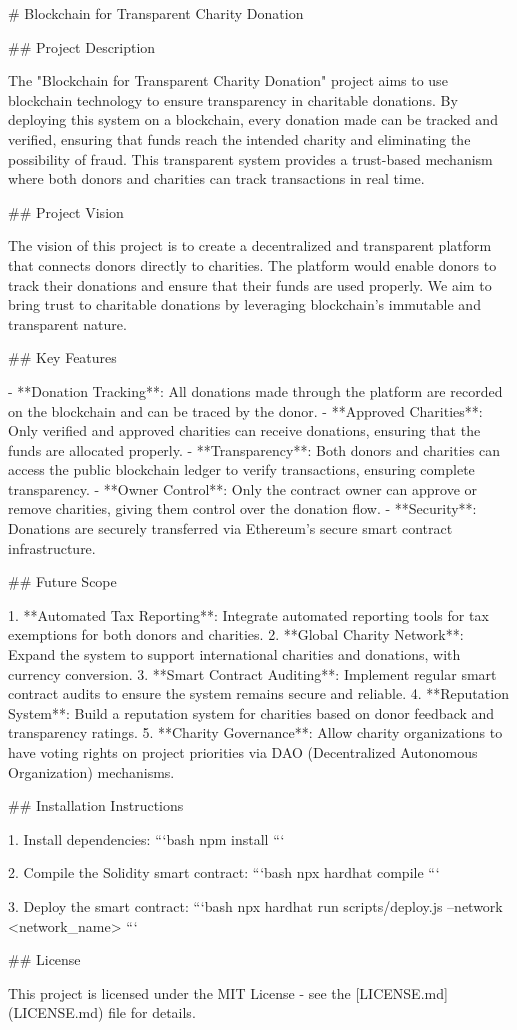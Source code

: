# Blockchain for Transparent Charity Donation

## Project Description

The "Blockchain for Transparent Charity Donation" project aims to use blockchain technology to ensure transparency in charitable donations. By deploying this system on a blockchain, every donation made can be tracked and verified, ensuring that funds reach the intended charity and eliminating the possibility of fraud. This transparent system provides a trust-based mechanism where both donors and charities can track transactions in real time.

## Project Vision

The vision of this project is to create a decentralized and transparent platform that connects donors directly to charities. The platform would enable donors to track their donations and ensure that their funds are used properly. We aim to bring trust to charitable donations by leveraging blockchain's immutable and transparent nature.

## Key Features

- **Donation Tracking**: All donations made through the platform are recorded on the blockchain and can be traced by the donor.
- **Approved Charities**: Only verified and approved charities can receive donations, ensuring that the funds are allocated properly.
- **Transparency**: Both donors and charities can access the public blockchain ledger to verify transactions, ensuring complete transparency.
- **Owner Control**: Only the contract owner can approve or remove charities, giving them control over the donation flow.
- **Security**: Donations are securely transferred via Ethereum’s secure smart contract infrastructure.

## Future Scope

1. **Automated Tax Reporting**: Integrate automated reporting tools for tax exemptions for both donors and charities.
2. **Global Charity Network**: Expand the system to support international charities and donations, with currency conversion.
3. **Smart Contract Auditing**: Implement regular smart contract audits to ensure the system remains secure and reliable.
4. **Reputation System**: Build a reputation system for charities based on donor feedback and transparency ratings.
5. **Charity Governance**: Allow charity organizations to have voting rights on project priorities via DAO (Decentralized Autonomous Organization) mechanisms.

## Installation Instructions

1. Install dependencies:
    ```bash
    npm install
    ```

2. Compile the Solidity smart contract:
    ```bash
    npx hardhat compile
    ```

3. Deploy the smart contract:
    ```bash
    npx hardhat run scripts/deploy.js --network <network_name>
    ```

## License

This project is licensed under the MIT License - see the [LICENSE.md](LICENSE.md) file for details.
